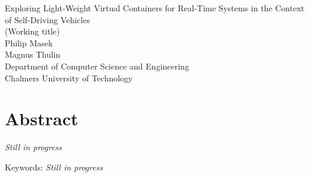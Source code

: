 Exploring Light-Weight Virtual Containers for Real-Time Systems in the Context of Self-Driving Vehicles\\
(Working title)\\
Philip Masek\\
Magnus Thulin\\
Department of Computer Science and Engineering\\
Chalmers University of Technology \setlength{\parskip}{0.5cm}

\thispagestyle{plain}			%
\setlength{\parskip}{0pt plus 1.0pt}
\section*{Abstract}
\textit{Still in progress}

\vfill
Keywords: \textit{Still in progress}

\newpage				%
\thispagestyle{empty}
\mbox{}